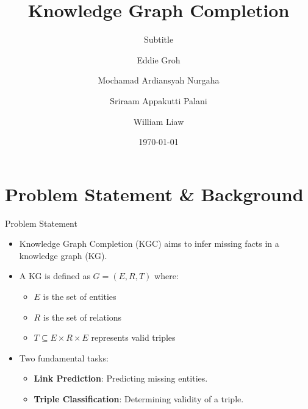 \documentclass[aspectratio=169,xcolor=dvipsnames]{beamer}
\title{Knowledge Graph Completion}
\subtitle{Subtitle}
\author{Eddie Groh \and Mochamad Ardiansyah Nurgaha \and Sriraam Appakutti Palani \and William Liaw}
\institute[Team: AWESome]
{
    Mehwish ALAM\\
    Associate Professor
    \and
    Language Models and Structured Data\\
}
\date{\today}
\begin{document}
\begin{frame}
    \titlepage
\end{frame}


\section{Problem Statement \& Background}
\begin{frame}{Problem Statement}
    \begin{itemize}
        \item Knowledge Graph Completion (KGC) aims to infer missing facts in a knowledge graph (KG).
        \item A KG is defined as $G = (E, R, T)$ where:
              \begin{itemize}
                  \item $E$ is the set of entities
                  \item $R$ is the set of relations
                  \item $T \subseteq E \times R \times E$ represents valid triples
              \end{itemize}
        \item Two fundamental tasks:
              \begin{itemize}
                  \item \textbf{Link Prediction}: Predicting missing entities.
                  \item \textbf{Triple Classification}: Determining validity of a triple.
              \end{itemize}
    \end{itemize}
\end{frame}
\end{document}
